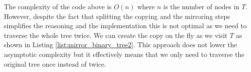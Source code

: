 The complexity of the code above is $O(n)$ where $n$ is the number of nodes in $T$.
However, despite the fact that splitting the copying and the mirroring steps simplifies the reasoning and the implementation this is not optimal as we need to traverse the whole tree twice. 
We can create the copy on the fly as we visit $T$ as shown in Listing \ref{list:mirror_binary_tree2}. 
This approach does not lower the asymptotic complexity but it effectively means that 
we only need to traverse the original tree once instead of twice. 



